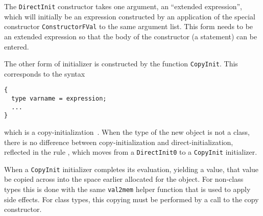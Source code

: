 \documentclass[11pt]{article}
\begin{document}
The \texttt{DirectInit} constructor takes one argument, an ``extended
expression'', which will initially be an expression constructed by an
application of the special constructor \texttt{ConstructorFVal} to the
same argument list.  This form needs to be an extended expression so
that the body of the constructor (a statement) can be entered.

The other form of initializer is constructed by the function
\texttt{CopyInit}.  This corresponds to the syntax
\begin{verbatim}
{
  type varname = expression;
  ...
}
\end{verbatim}
which is a
copy-initialization~\cite[\emph{ibid}]{cpp-standard-iso14882}.  When
the type of the new object is not a class, there is no difference
between copy-initialization and direct-initialization, reflected in
the rule , which
moves from a \texttt{DirectInit0} to a \texttt{CopyInit} initializer.

When a \texttt{CopyInit} initializer completes its evaluation,
yielding a value, that value be copied across into the space earlier
allocated for the object.  For non-class types this is done with the
same \texttt{val2mem} helper function that is used to apply side
effects.  For class types, this copying must be performed by a call to
the copy constructor.
\end{document}
